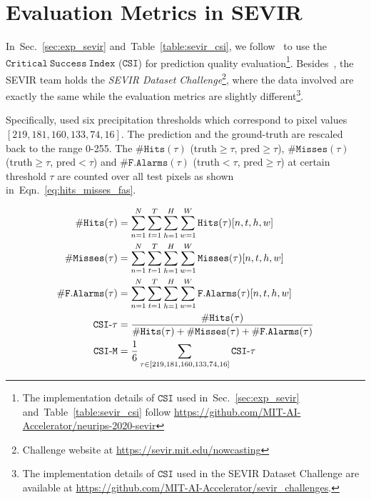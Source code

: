 \documentclass{article}
\newcommand{\tabref}[1]{Table~\ref{#1}}
\newcommand{\secref}[1]{Sec.~\ref{#1}}
\newcommand{\eqnref}[1]{Eqn.~\ref{#1}}
\begin{document}
\section{Evaluation Metrics in SEVIR}
In~\secref{sec:exp_sevir} and~\tabref{table:sevir_csi}, we follow~\cite{veillette2020sevir} to use the $\mathtt{Critical\ Success\ Index}$ ($\mathtt{CSI}$) for prediction quality evaluation\footnote{The implementation details of $\mathtt{CSI}$ used in~\secref{sec:exp_sevir} and~\tabref{table:sevir_csi} follow \url{https://github.com/MIT-AI-Accelerator/neurips-2020-sevir}}.
Besides~\cite{veillette2020sevir}, the SEVIR team holds the \emph{SEVIR Dataset Challenge}\footnote{Challenge website at \url{https://sevir.mit.edu/nowcasting}}, where the data involved are exactly the same while the evaluation metrics are slightly different\footnote{The implementation details of $\mathtt{CSI}$ used in the SEVIR Dataset Challenge are available at \url{https://github.com/MIT-AI-Accelerator/sevir_challenges}.}.

Specifically, \cite{veillette2020sevir} used six precipitation thresholds which correspond to pixel values $[219, 181, 160, 133, 74, 16]$. 
The prediction and the ground-truth are rescaled back to the range 0-255.
The $\mathtt{\#Hits}(\tau)$ (truth$\geq\tau$, pred$\geq\tau$), $\mathtt{\#Misses}(\tau)$ (truth$\geq\tau$, pred$<\tau$) and $\mathtt{\#F.Alarms}(\tau)$ (truth$<\tau$, pred$\geq\tau$) at certain threshold $\tau$ are counted over all test pixels as shown in~\eqnref{eq:hits_misses_fas}.

\begin{align}
    \centering
    \begin{aligned}
\mathtt{\#Hits}(\tau) &= \sum^N_{n=1}\sum^T_{t=1}\sum^H_{h=1}\sum^W_{w=1}\mathtt{Hits}(\tau)[n, t , h, w] \\
        \mathtt{\#Misses}(\tau) &= \sum^N_{n=1}\sum^T_{t=1}\sum^H_{h=1}\sum^W_{w=1}\mathtt{Misses}(\tau)[n, t , h, w] \\
        \mathtt{\#F.Alarms}(\tau) &= \sum^N_{n=1}\sum^T_{t=1}\sum^H_{h=1}\sum^W_{w=1}\mathtt{F.Alarms}(\tau)[n, t , h, w] \\
\mathtt{CSI}\mbox{-}\tau &= \frac{\mathtt{\#Hits}(\tau)}{\mathtt{\#Hits}(\tau)+\mathtt{\#Misses}(\tau)+\mathtt{\#F.Alarms}(\tau)} \\
        \mathtt{CSI}\mbox{-}\mathtt{M} &= \frac{1}{6}\sum_{\tau\in[219, 181, 160, 133, 74, 16]}\mathtt{CSI}\mbox{-}\tau
    \end{aligned}
    \label{eq:hits_misses_fas}
\end{align}
\end{document}
